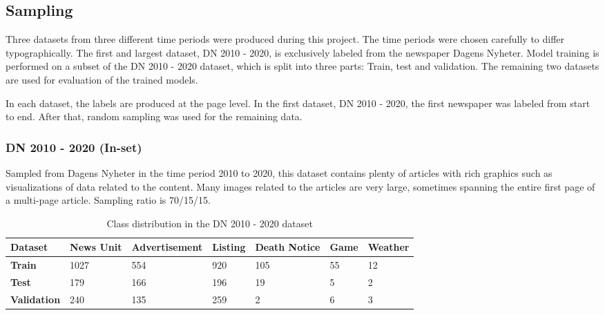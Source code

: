 \documentclass[english, bibtex]{kththesis}
\begin{document}
\subsection{Sampling}

Three datasets from three different time periods were produced during this project. The time periods were chosen carefully to differ typographically. The first and largest dataset, DN 2010 - 2020,  is exclusively labeled from the newspaper Dagens Nyheter. Model training is performed on a subset of the DN 2010 - 2020 dataset, which is split into three parts: Train, test and validation. The remaining two datasets are used for evaluation of the trained models.

In each dataset, the labels are produced at the page level. In the first dataset, DN 2010 - 2020, the first newspaper was labeled from start to end. After that, random sampling was used for the remaining data. 


\subsubsection{DN 2010 - 2020 (In-set)}

Sampled from Dagens Nyheter in the time period 2010 to 2020, this dataset contains plenty of articles with rich graphics such as visualizations of data related to the content. Many images related to the articles are very large, sometimes spanning the entire first page of a multi-page article. Sampling ratio is 70/15/15.

\begin{table}[!ht]
  \begin{center}
    \caption{Class distribution in the DN 2010 - 2020 dataset}
    \label{tab:trainclassdist}
    \begin{tabular}{l|l|l|l|l|l|l} %
    \textbf{Dataset} & \textbf{News Unit} & \textbf{Advertisement} & \textbf{Listing} & \textbf{Death Notice} & \textbf{Game} & \textbf{Weather}  \\ 
    \hline
    \textbf{Train} & 1027 & 554 & 920 & 105 & 55 & 12 \\    \hline
    \textbf{Test} & 179 & 166 & 196 & 19 & 5 & 2 \\    \hline
    \textbf{Validation} & 240 & 135 & 259 & 2 & 6 & 3 \\    \hline
    \end{tabular}
  \end{center}
\end{table}
\end{document}
